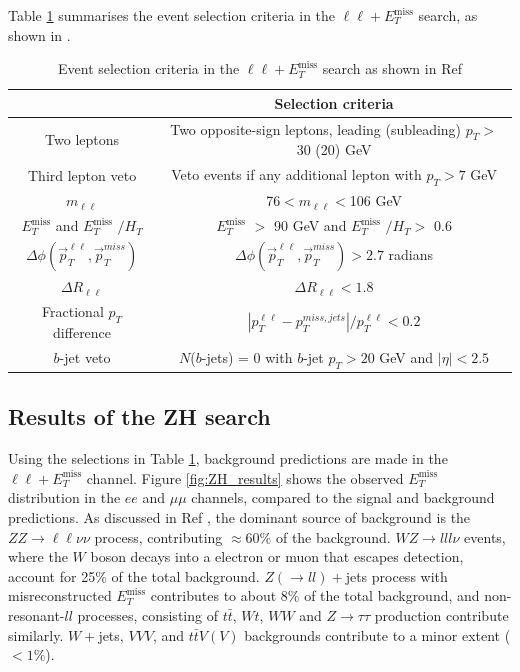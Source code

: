 \documentclass[12pt,a4paper,openright,twoside]{report}
\newcommand{\ZZ}{$ZZ\to \ell\ell\nu\nu$ }
\newcommand{\llM}{$\ell\ell+E_T^{\mathrm{miss}}$ }
\newcommand{\met}{$E_T^{\mathrm{miss}}$ }
\begin{document}
Table \ref{table:event_selection} summarises the event selection criteria in the $\ell\ell+$\met search, as shown in \cite{ZH_ATLAS}.
{\renewcommand{\arraystretch}{1.5}
\begin{table}[H]
\centering
\begin{tabular}{c c}
\hline
\hline
& Selection criteria\\
\hline
Two leptons & Two opposite-sign leptons, leading (subleading) $p_T>$ 30 (20) GeV \\
\hline
Third lepton veto & Veto events if any additional lepton with $p_T>7$ GeV\\
\hline
$m_{\ell\ell}$ & 76$<m_{\ell\ell}<$106 GeV\\
\hline
\met and \met$/H_T$ & \met$>$ 90 GeV and \met$/H_T >$ 0.6\\
\hline
$\Delta\phi(\vec{p}_T^{\ell\ell},\vec{p}_T^{miss})$ & $\Delta\phi(\vec{p}_T^{\ell\ell},\vec{p}_T^{miss})>2.7$ radians\\
\hline
$\Delta R_{\ell\ell}$ & $\Delta R_{\ell\ell}<1.8$\\
\hline
Fractional $p_T$ difference & $\left| p_T^{\ell\ell} - p_T^{miss,jets}\right|/p_T^{\ell\ell}<0.2$\\
\hline
$b$-jet veto & $N$($b$-jets) = 0 with $b$-jet $p_T>20$ GeV and $|\eta|<2.5$\\
\hline
\hline
\end{tabular}
\caption{Event selection criteria in the $\ell\ell+$\met search as shown in Ref \cite{ZH_ATLAS}}
\label{table:event_selection}
\end{table}
}
\subsection{Results of the ZH search}
Using the selections in Table \ref{table:event_selection}, background predictions are made in the \llM channel. Figure \ref{fig:ZH_results} shows the observed \met distribution in the $ee$ and $\mu\mu$ channels, compared to the signal and background predictions. As discussed in Ref \cite{ZH_ATLAS}, the dominant source of background is the \ZZ process, contributing $\approx 60\%$ of the background. $WZ\to lll\nu$ events, where the $W$ boson decays into a electron or muon that escapes detection, account for 25\% of the total background. $Z(\to ll)+$jets process with misreconstructed \met contributes to about 8\% of the total background, and non-resonant-$ll$ processes, consisting of $t\bar{t}$, $Wt$, $WW$ and $Z\to\tau\tau$ production contribute similarly. $W+$jets, $VVV$, and $t\bar{t}V(V)$ backgrounds contribute to a minor extent ($<1\%$).
\end{document}
